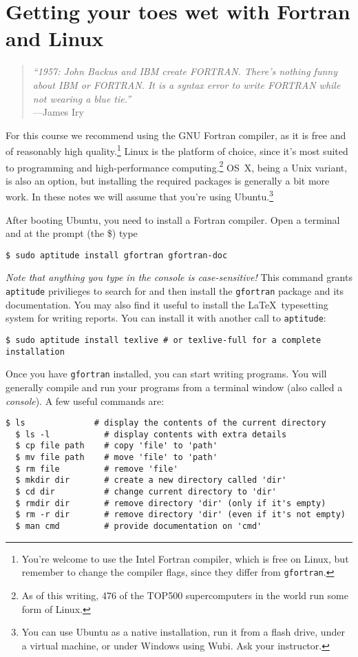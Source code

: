 \chapter{Getting your toes wet with Fortran and Linux}
\label{chap:Getting your toes wet}
\begin{quote}\small
  \emph{``1957: John Backus and IBM create FORTRAN. There's nothing funny about IBM or FORTRAN. It is a syntax error to write FORTRAN while not wearing a blue tie.''} \\ \hspace*{\fill}---James Iry
\end{quote}

For this course we recommend using the GNU Fortran compiler, as it is free and of reasonably high quality.\footnote{You're welcome to use the Intel Fortran compiler, which is free on Linux, but remember to change the compiler flags, since they differ from \texttt{gfortran}.}
Linux is the platform of choice, since it's most suited to programming and high-performance computing.\footnote{As of this writing, 476 of the TOP500 supercomputers in the world run some form of Linux.}
OS~X, being a Unix variant, is also an option, but installing the required packages is generally a bit more work.
In these notes we will assume that you're using Ubuntu.\footnote{You can use Ubuntu as a native installation, run it from a flash drive, under a virtual machine, or under Windows using Wubi.
Ask your instructor.}

After booting Ubuntu, you need to install a Fortran compiler.
Open a terminal and at the prompt (the \$) type
\begin{lstlisting}[style=prompt, nolol]
  $ sudo aptitude install gfortran gfortran-doc
\end{lstlisting}
\emph{Note that anything you type in the console is case-sensitive!}
This command grants \texttt{aptitude} privilieges to search for and then install the \texttt{gfortran} package and its documentation.
You may also find it useful to install the \LaTeX\ typesetting system for writing reports.
You can install it with another call to \texttt{aptitude}:
\begin{lstlisting}[style=prompt, nolol]
  $ sudo aptitude install texlive # or texlive-full for a complete installation
\end{lstlisting}

Once you have \texttt{gfortran} installed, you can start writing programs.
You will generally compile and run your programs from a terminal window (also called a \emph{console}).
A few useful commands are:
\begin{lstlisting}[style=prompt, nolol]
  $ ls              # display the contents of the current directory
  $ ls -l           # display contents with extra details
  $ cp file path    # copy 'file' to 'path'
  $ mv file path    # move 'file' to 'path'
  $ rm file         # remove 'file'
  $ mkdir dir       # create a new directory called 'dir'
  $ cd dir          # change current directory to 'dir'
  $ rmdir dir       # remove directory 'dir' (only if it's empty)
  $ rm -r dir       # remove directory 'dir' (even if it's not empty)
  $ man cmd         # provide documentation on 'cmd'
\end{lstlisting}

